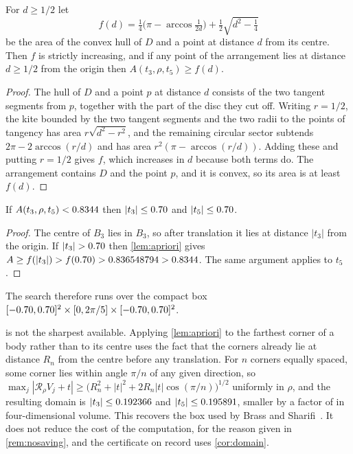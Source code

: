 \documentclass[a4paper,UKenglish,cleveref,autoref,thm-restate,numberwithinsect]{lipics-v2021}
\newcommand{\Rot}{\mathcal{R}}
\begin{document}
\begin{lemma}
\label{lem:apriori}
For $d\ge1/2$ let
\[
  f(d)=\tfrac14\bigl(\pi-\arccos\tfrac{1}{2d}\bigr)+\tfrac12\sqrt{d^{2}-\tfrac14}
\]
be the area of the convex hull of $D$ and a point at distance $d$ from its
centre. Then $f$ is strictly increasing, and if any point of the arrangement lies
at distance $d\ge 1/2$ from the origin then $A(t_3,\rho,t_5)\ge f(d)$.
\end{lemma}

\begin{proof}
The hull of $D$ and a point $p$ at distance $d$ consists of the two tangent
segments from $p$, together with the part of the disc they cut off. Writing
$r=1/2$, the kite bounded by the two tangent segments and the two radii to the
points of tangency has area $r\sqrt{d^{2}-r^{2}}$, and the remaining circular
sector subtends $2\pi-2\arccos(r/d)$ and has area $r^{2}(\pi-\arccos(r/d))$.
Adding these and putting $r=1/2$ gives $f$, which increases in $d$ because both
terms do. The arrangement contains $D$ and the point $p$, and it is convex, so
its area is at least $f(d)$.
\end{proof}

\begin{corollary}
\label{cor:domain}
If $A(t_3,\rho,t_5)<0.8344$ then $|t_3|\le0.70$ and
$|t_5|\le0.70$.
\end{corollary}

\begin{proof}
The centre of $B_3$ lies in $B_3$, so after translation it lies at distance
$|t_3|$ from the origin. If $|t_3|>\TmaxNaive$ then \cref{lem:apriori} gives
$A\ge f(|t_3|)>f(0.70)>0.836548794>0.8344$. The same argument applies to
$t_5$.
\end{proof}

The search therefore runs over the compact box
$[-0.70,0.70]^{2}\times[0,2\pi/5]\times[-0.70,0.70]^{2}$.

\begin{remark}
\label{rem:sharperdomain}
 is not the sharpest available. Applying \cref{lem:apriori} to
the farthest corner of a body rather than to its centre uses the fact that the
corners already lie at distance $R_n$ from the centre before any translation. For
$n$ corners equally spaced, some corner lies within angle $\pi/n$ of any given
direction, so $\max_j|\Rot_\rho V_j+t|\ge\bigl(R_n^{2}+|t|^{2}+2R_n|t|\cos(\pi/n)
\bigr)^{1/2}$ uniformly in $\rho$, and the resulting domain is
$|t_3|\le0.192366$ and $|t_5|\le0.195891$, smaller by a factor of
\DomainShrink{} in four-dimensional volume. This recovers the box used by Brass
and Sharifi~\cite{BrassSharifi2005}. It does not reduce the cost of the
computation, for the reason given in \cref{rem:nosaving}, and the certificate on
record uses \cref{cor:domain}.
\end{remark}
\end{document}
